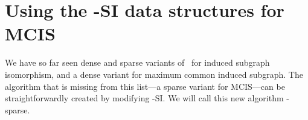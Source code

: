 
\section{Using the \McSplit-SI data structures for MCIS}

We have so far seen dense and sparse variants of \McSplit\ for induced subgraph isomorphism, and
a dense variant for maximum common induced subgraph.  The algorithm that is missing from this
list---a sparse variant for MCIS---can be straightforwardly created by modifying \McSplit-SI. 
We will call this new algorithm \McSplit-sparse.

